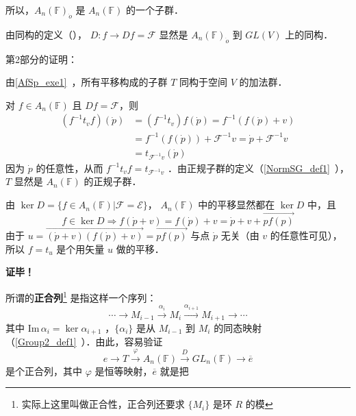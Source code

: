 所以，$A_n(\mathbb F)_{\dot o}$ 是 $A_n(\mathbb F)$ 的一个子群．

由同构的定义（）， $D:f\rightarrow Df=\mathcal F$ 显然是 $A_n(\mathbb F)_{\dot o}$ 到 $GL(V)$ 上的同构．

第2部分的证明：

由\autoref{AfSp_exe1}~，所有平移构成的子群 $T$ 同构于空间 $V$ 的加法群．
 
对 $f\in A_n(\mathbb F)$ 且 $Df=\mathcal F$，则
\begin{equation}
\begin{aligned}
(f^{-1}t_vf)(\dot p)&=(f^{-1}t_v)f(\dot p)=f^{-1}(f(\dot p)+v)\\
&=f^{-1}(f(\dot p))+\mathcal F^{-1}v=\dot p+\mathcal F^{-1}v\\
&=t_{\mathcal F^{-1}v}(\dot p)
\end{aligned}
\end{equation}
因为 $\dot p$ 的任意性，从而 $f^{-1}t_vf=t_{\mathcal F^{-1}v}$ ．由正规子群的定义（\autoref{NormSG_def1}~），$T$ 显然是 $A_n(\mathbb F)$ 的正规子群．

由 $\ker D=\{f\in A_n(\mathbb F)|\mathcal F=\mathcal E\}$， $A_n(\mathbb F)$ 中的平移显然都在 $\ker D$ 中，且
\begin{equation}
f\in \ker D\Rightarrow f(\dot p+v)=f(\dot p)+v=\dot p+v+\overrightarrow{pf(p)}
\end{equation}
由于 $u=\overrightarrow{(\dot p+v)(f(\dot p)+v)}=\overrightarrow{pf(p)}$ 与点 $\dot p$ 无关（由 $v$ 的任意性可见），所以 $f=t_u$ 是个用矢量 $u$ 做的平移．

\textbf{证毕！}

所谓的\textbf{正合列}\footnote{实际上这里叫做正合性，正合列还要求 $\{M_i\}$ 是环 $R$ 的模} 是指这样一个序列：
\begin{equation}
\cdots\rightarrow M_{i-1}\xrightarrow{\alpha_i} M_{i}\xrightarrow{\alpha_{i+1}}M_{i+1}\rightarrow\cdots
\end{equation}
其中 $\mathrm{Im}\,\alpha_{i}=\ker\alpha_{i+1}$ ，$\{\alpha_i\}$ 是从 $M_{i-1}$ 到 $M_i$ 的同态映射（\autoref{Group2_def1}~）．由此，容易验证
\begin{equation}
e\rightarrow T\xrightarrow{\varphi}A_n(\mathbb F)\xrightarrow{D} GL_n(\mathbb F)\rightarrow \overline{e}
\end{equation}
是个正合列，其中 $\varphi$ 是恒等映射，$\overline{e}$ 就是把